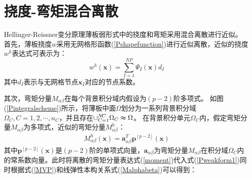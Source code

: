 \section{挠度-弯矩混合离散}
Hellinger-Reissner变分原理薄板弱形式中的挠度和弯矩采用混合离散进行近似。
首先，薄板挠度$w$采用无网格形函数(\ref{Pshapefunction})进行近似离散，近似的挠度$w^h$表达式可表示为：
\begin{equation}\label{w}
    w^h(\pmb{x})=\sum_{I=1}^{N\!P}\Psi_I(\pmb{x})d_{I}
\end{equation}
其中$d_I$表示与无网格节点$\pmb{x}_I$对应的节点系数。\par
其次，弯矩分量$M_{\alpha\beta}$在每个背景积分域内假设为$(p-2)$阶多项式。
如图(\ref{Pintegralscheme})所示，将薄板中面$\Omega$划分为一系列背景积分域$\Omega_C,C=1,2,\dotsb,n_C$，并且存在$\cup_{C=1}^{N\!C}\Omega_C\thickapprox\Omega$。
在背景积分单元$\Omega_C$内，假定弯矩分量$M_{\alpha\beta}$为多项式，近似的弯矩分量$M_{\alpha\beta}^h$：
\begin{equation}\label{moment}
\begin{split}
    M^h_{\alpha\beta}(\pmb{x})=\pmb{a}_{\alpha\beta}^T\pmb{p}^{[p-2]}(\pmb{x})
\end{split}
\end{equation}
其中$\pmb{p}^{[p-2]}(\pmb x)$是$(p-2)$阶的单项式向量，$\pmb{a}_{\alpha\beta}$为弯矩分量$M_{\alpha\beta}$在积分域$\Omega_C$内的常系数向量。此时将离散的弯矩分量表达式(\ref{moment})代入式(\ref{Pweakform1})同时根据式(\ref{MVP})和线弹性本构关系式(\ref{Malphabeta})可以得到：
